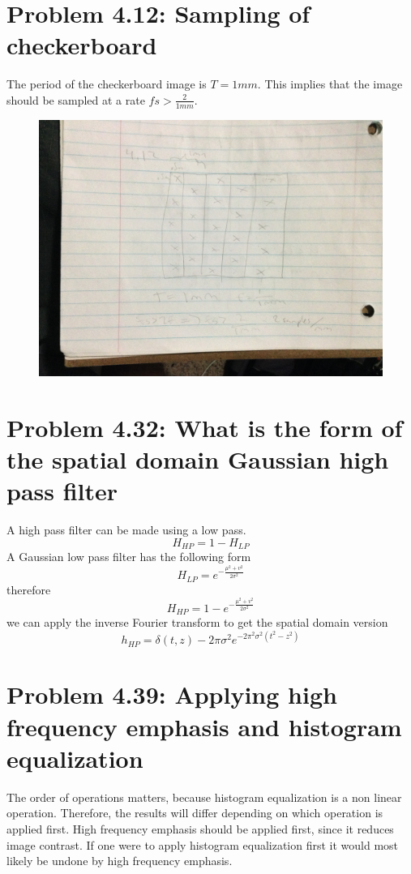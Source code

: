 \documentclass{article}
\begin{document}
	\newpage
	\section{Problem 4.12: Sampling of checkerboard}
	The period of the checkerboard image is \(T = 1mm\). This implies that the image should be sampled at a rate \(fs > \frac{2}{1mm}\).
	\begin{figure}[H]
		\includegraphics[width=\linewidth]{fig2.JPG}
	\end{figure}
	
	\newpage
	\section{Problem 4.32: What is the form of the spatial domain Gaussian high pass filter}
	A high pass filter can be made using a low pass.
	\[H_{HP} = 1 - H_{LP}\]
	A Gaussian low pass filter has the following form
	\[H_{LP} = e^{-\frac{\mu^2 + v^2}{2\sigma^2}}\]
	therefore
	\[H_{HP} = 1 - e^{-\frac{\mu^2 + v^2}{2\sigma^2}}\]
	we can apply the inverse Fourier transform to get the spatial domain version
	\[h_{HP} = \delta(t,z) - 2\pi\sigma^2 e^{-2\pi^2\sigma^2(t^2 - z^2)}\]
	
	\newpage
	\section{Problem 4.39: Applying high frequency emphasis and histogram equalization}
	The order of operations matters, because histogram equalization is a non linear operation. Therefore, the results will differ depending on which operation is applied first.
	High frequency emphasis should be applied first, since it reduces image contrast. If one were to apply histogram equalization first it would most likely be undone by high frequency emphasis.
	
\end{document}
